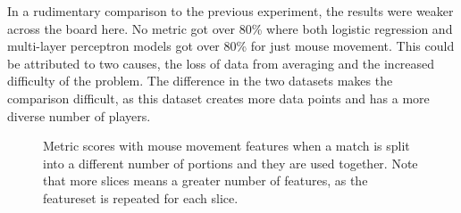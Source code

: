 \documentclass[Report.tex]{subfiles}
\newcommand{\baraxis}[8]{
\begin{axis}[
    ybar,
    title={#1},
    width=#5,
    height=#6,
    ymin=#3, ymax=#4,
    bar width=1em,
    legend style={at={#7},anchor=north,legend columns=-1},
    enlarge x limits=0.4,
    x tick label style={align=center,text width=#8},
    symbolic x coords={Logistic Regression, Random Forest, Multi-layer Perceptron},
    xtick=data,
    ylabel={#2}
]
}
\newcommand{\plotbar}[5]{
\addplot+[
	discard if not={numSplits}{#1},
	discard if not={split}{#2},
	discard if not={features}{#3},
] table [x=model, y=#4,col sep=comma] {data/19-pair-cv.csv};
\addlegendentry{#5}
}
\begin{document}
In a rudimentary comparison to the previous experiment, the results were weaker across the board here. No metric got over 80\% where both logistic regression and multi-layer perceptron models got over 80\% for just mouse movement. This could be attributed to two causes, the loss of data from averaging and the increased difficulty of the problem. The difference in the two datasets makes the comparison difficult, as this dataset creates more data points and has a more diverse number of players. 

\begin{figure}[H]
\begin{subfigure}{1\textwidth}
\centering
{}
\end{subfigure}

\begin{subfigure}{0.45\textwidth}
\centering
{}
\end{subfigure}
\hspace{\fill}
\begin{subfigure}{0.45\textwidth}
\centering
{}
\end{subfigure}
\caption{Metric scores with mouse movement features when a match is split into a different number of portions and they are used together. Note that more slices means a greater number of features, as the featureset is repeated for each slice.}
\end{figure}
\end{document}
